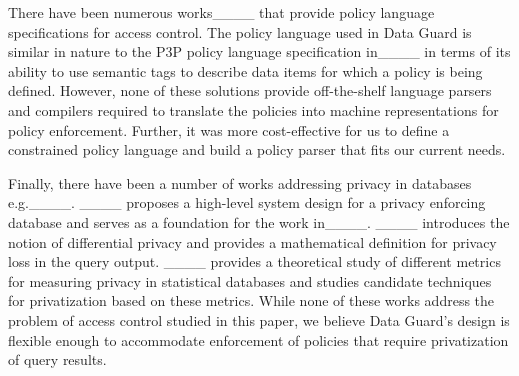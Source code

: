 There have been numerous works____ that provide policy language specifications for access control. The policy language used in Data Guard is similar in nature to the P3P policy language specification in____ in terms of its ability to use semantic tags to describe data items for which a policy is being defined. However, none of these solutions provide off-the-shelf language parsers and compilers required to translate the policies into machine representations for policy enforcement. Further, it was more cost-effective for us to define a constrained policy language and build a policy parser that fits our current needs. 

Finally, there have been a number of works addressing privacy in databases e.g.____. ____ proposes a high-level system design for a privacy enforcing database and serves as a foundation for the work in____. ____ introduces the notion of differential privacy and provides a mathematical definition for privacy loss in the query output. ____ provides a theoretical study of different metrics for measuring privacy in statistical databases and studies candidate techniques for privatization based on these metrics. While none of these works address the problem of access control studied in this paper, we believe Data Guard's design is flexible enough to accommodate enforcement of policies that require privatization of query results.